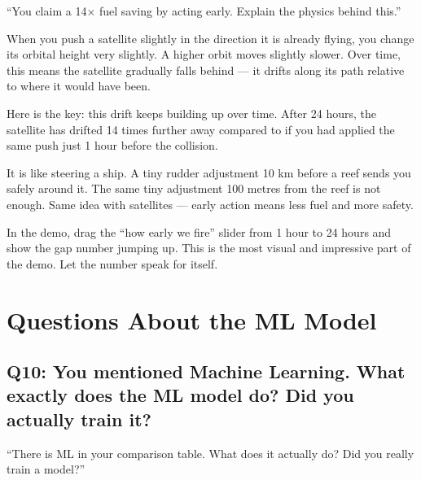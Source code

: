 \documentclass[11pt,a4paper]{article}
\begin{document}
\begin{questionbox}
``You claim a 14$\times$ fuel saving by acting early. Explain the physics behind this.''
\end{questionbox}

\begin{answerbox}
When you push a satellite slightly in the direction it is already flying, you change its orbital height very slightly. A higher orbit moves slightly slower. Over time, this means the satellite gradually falls behind --- it drifts along its path relative to where it would have been.

Here is the key: this drift keeps building up over time. After 24 hours, the satellite has drifted 14 times further away compared to if you had applied the same push just 1 hour before the collision.

It is like steering a ship. A tiny rudder adjustment 10 km before a reef sends you safely around it. The same tiny adjustment 100 metres from the reef is not enough. Same idea with satellites --- early action means less fuel and more safety.
\end{answerbox}

\begin{tipbox}
In the demo, drag the ``how early we fire'' slider from 1 hour to 24 hours and show the gap number jumping up. This is the most visual and impressive part of the demo. Let the number speak for itself.
\end{tipbox}

\newpage
\section{Questions About the ML Model}

\subsection*{Q10: You mentioned Machine Learning. What exactly does the ML model do? Did you actually train it?}

\begin{questionbox}
``There is ML in your comparison table. What does it actually do? Did you really train a model?''
\end{questionbox}
\end{document}
